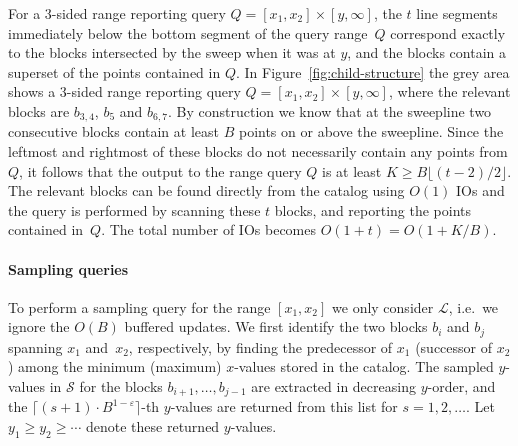 \documentclass[11pt]{article}
\begin{document}
For a 3-sided range reporting query $Q=[x_1,x_2]\times[y,\infty]$, the
$t$ line segments immediately below the bottom segment of the query
range~$Q$ correspond exactly to the blocks intersected by the sweep
when it was at $y$, and the blocks contain a superset of the points
contained in $Q$. In Figure~\ref{fig:child-structure} the grey area
shows a 3-sided range reporting query $Q=[x_1,x_2]\times[y,\infty]$,
where the relevant blocks are $b_{3,4}$, $b_5$ and $b_{6,7}$. By
construction we know that at the sweepline two consecutive blocks
contain at least $B$ points on or above the sweepline. Since the
leftmost and rightmost of these blocks do not necessarily contain any
points from $Q$, it follows that the output to the range query $Q$ is
at least $K\geq B\lfloor(t-2)/2\rfloor$. The relevant blocks can be
found directly from the catalog using $O(1)$ IOs and the query is
performed by scanning these $t$ blocks, and reporting the points
contained in~$Q$.  The total number of IOs becomes $O(1+t)=O(1+K/B)$.

\paragraph*{Sampling queries}

To perform a sampling query for the range $[x_1,x_2]$ we only consider
$\mathcal{L}$, i.e.\ we ignore the $O(B)$ buffered updates.  We first
identify the two blocks $b_i$ and $b_j$ spanning $x_1$ and~$x_2$,
respectively, by finding the predecessor of $x_1$ (successor of $x_2$)
among the minimum (maximum) $x$-values stored in the catalog.
%
The sampled $y$-values in $\mathcal{S}$ for the blocks
$b_{i+1},\ldots,b_{j-1}$ are extracted in decreasing $y$-order, and
the $\lceil (s+1)\cdot B^{1-\varepsilon}\rceil$-th $y$-values are
returned from this list for $s=1,2,\ldots$. Let $y_1\geq y_2 \geq
\cdots$ denote these returned $y$-values.
\end{document}
